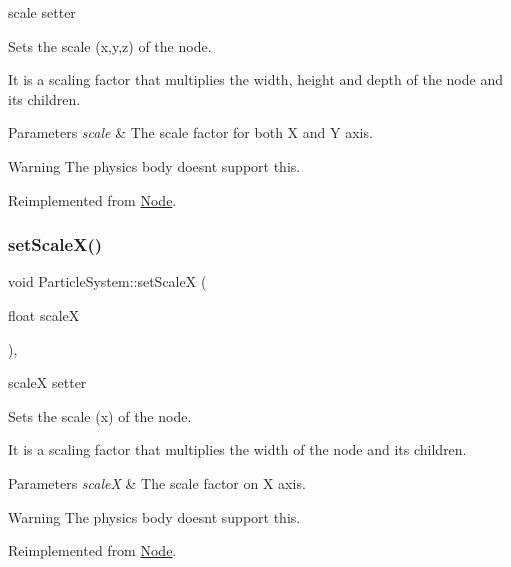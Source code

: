 scale setter 

Sets the scale (x,y,z) of the node.

It is a scaling factor that multiplies the width, height and depth of the node and its children.


\begin{DoxyParams}{Parameters}
{\em scale} & The scale factor for both X and Y axis.\\
\hline
\end{DoxyParams}
\begin{DoxyWarning}{Warning}
The physics body doesn\textquotesingle{}t support this. 
\end{DoxyWarning}


Reimplemented from \hyperlink{classNode_acf0955a52f51a9d6c8b0c9267b1e8668}{Node}.

\mbox{\label{classParticleSystem_aa1634f3d3f3d13ad5d3c14f901be0bc0}} 
\subsubsection{\texorpdfstring{set\+Scale\+X()}{setScaleX()}\hspace{0.1cm}{\footnotesize\ttfamily [1/2]}}
{\footnotesize\ttfamily void Particle\+System\+::set\+ScaleX (\begin{DoxyParamCaption}\item[{float}]{scaleX }\end{DoxyParamCaption})\hspace{0.3cm}{\ttfamily [override]}, {\ttfamily [virtual]}}



scaleX setter 

Sets the scale (x) of the node.

It is a scaling factor that multiplies the width of the node and its children.


\begin{DoxyParams}{Parameters}
{\em scaleX} & The scale factor on X axis.\\
\hline
\end{DoxyParams}
\begin{DoxyWarning}{Warning}
The physics body doesn\textquotesingle{}t support this. 
\end{DoxyWarning}


Reimplemented from \hyperlink{classNode_acf7f04074f7f49972e152788c090b877}{Node}.

